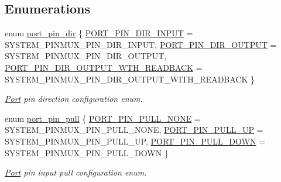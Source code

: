 \subsection*{Enumerations}
\begin{DoxyCompactItemize}
\item 
enum \mbox{\hyperlink{group__asfdoc__sam0__port__group_gabe12893c067f9b011ece79c1bf1b128a}{port\+\_\+pin\+\_\+dir}} \{ \mbox{\hyperlink{group__asfdoc__sam0__port__group_ggabe12893c067f9b011ece79c1bf1b128aacfdf36142de0378cd9927b9c00e2f7a6}{P\+O\+R\+T\+\_\+\+P\+I\+N\+\_\+\+D\+I\+R\+\_\+\+I\+N\+P\+UT}} = S\+Y\+S\+T\+E\+M\+\_\+\+P\+I\+N\+M\+U\+X\+\_\+\+P\+I\+N\+\_\+\+D\+I\+R\+\_\+\+I\+N\+P\+UT, 
\mbox{\hyperlink{group__asfdoc__sam0__port__group_ggabe12893c067f9b011ece79c1bf1b128aaa2cda8b4095bfaf6f354f113947a3463}{P\+O\+R\+T\+\_\+\+P\+I\+N\+\_\+\+D\+I\+R\+\_\+\+O\+U\+T\+P\+UT}} = S\+Y\+S\+T\+E\+M\+\_\+\+P\+I\+N\+M\+U\+X\+\_\+\+P\+I\+N\+\_\+\+D\+I\+R\+\_\+\+O\+U\+T\+P\+UT, 
\mbox{\hyperlink{group__asfdoc__sam0__port__group_ggabe12893c067f9b011ece79c1bf1b128aae3d3fdfe355c7727ea36948da3b848ad}{P\+O\+R\+T\+\_\+\+P\+I\+N\+\_\+\+D\+I\+R\+\_\+\+O\+U\+T\+P\+U\+T\+\_\+\+W\+T\+H\+\_\+\+R\+E\+A\+D\+B\+A\+CK}} = S\+Y\+S\+T\+E\+M\+\_\+\+P\+I\+N\+M\+U\+X\+\_\+\+P\+I\+N\+\_\+\+D\+I\+R\+\_\+\+O\+U\+T\+P\+U\+T\+\_\+\+W\+I\+T\+H\+\_\+\+R\+E\+A\+D\+B\+A\+CK
 \}
\begin{DoxyCompactList}\small\item\em \mbox{\hyperlink{struct_port}{Port}} pin direction configuration enum. \end{DoxyCompactList}\item 
enum \mbox{\hyperlink{group__asfdoc__sam0__port__group_ga1f47828261f5b7ac5f864b42981a2004}{port\+\_\+pin\+\_\+pull}} \{ \mbox{\hyperlink{group__asfdoc__sam0__port__group_gga1f47828261f5b7ac5f864b42981a2004ab178b34fb381794e7f550b14ff08a302}{P\+O\+R\+T\+\_\+\+P\+I\+N\+\_\+\+P\+U\+L\+L\+\_\+\+N\+O\+NE}} = S\+Y\+S\+T\+E\+M\+\_\+\+P\+I\+N\+M\+U\+X\+\_\+\+P\+I\+N\+\_\+\+P\+U\+L\+L\+\_\+\+N\+O\+NE, 
\mbox{\hyperlink{group__asfdoc__sam0__port__group_gga1f47828261f5b7ac5f864b42981a2004a6505b9a836a818d1f2c8a248b9ac8073}{P\+O\+R\+T\+\_\+\+P\+I\+N\+\_\+\+P\+U\+L\+L\+\_\+\+UP}} = S\+Y\+S\+T\+E\+M\+\_\+\+P\+I\+N\+M\+U\+X\+\_\+\+P\+I\+N\+\_\+\+P\+U\+L\+L\+\_\+\+UP, 
\mbox{\hyperlink{group__asfdoc__sam0__port__group_gga1f47828261f5b7ac5f864b42981a2004a2665866a5f05266cc8fa78da60ebc19d}{P\+O\+R\+T\+\_\+\+P\+I\+N\+\_\+\+P\+U\+L\+L\+\_\+\+D\+O\+WN}} = S\+Y\+S\+T\+E\+M\+\_\+\+P\+I\+N\+M\+U\+X\+\_\+\+P\+I\+N\+\_\+\+P\+U\+L\+L\+\_\+\+D\+O\+WN
 \}
\begin{DoxyCompactList}\small\item\em \mbox{\hyperlink{struct_port}{Port}} pin input pull configuration enum. \end{DoxyCompactList}\end{DoxyCompactItemize}
